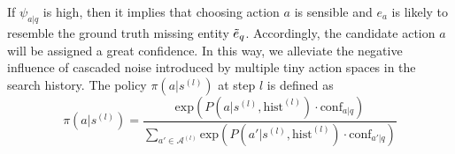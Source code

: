 \documentclass[runningheads]{llncs}
\begin{document}
If $\psi_{a|q}$ is high, then it implies that choosing action $a$ is sensible 
and $e_a$ is likely to resemble the ground truth missing entity $\Tilde{e}_q$. 
Accordingly, the candidate action $a$ will be assigned a great confidence. In this way, 
we alleviate the negative influence of cascaded noise introduced by multiple tiny action spaces in the search history.
The policy $\pi(a|s^{(l)})$ at step $l$ is defined as
\begin{equation}
\label{eq: policy}
    \pi(a|s^{(l)}) = \frac{\text{exp}(P(a|s^{(l)}, \text{hist}^{(l)}) \cdot \text{conf}_{a|q})}{\sum_{a' \in \mathcal{A}^{(l)}} \text{exp}(P(a'|s^{(l)}, \text{hist}^{(l)}) \cdot \text{conf}_{a'|q})}
\end{equation}
\end{document}

